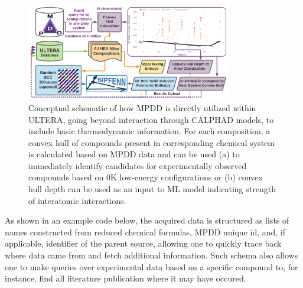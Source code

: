 \begin{figure}[H]
    \centering
    \includegraphics[width=0.8\textwidth]{ultera/ULTERA_BasicThermodynamics_V1.png}
    \caption{Conceptual schematic of how MPDD is directly utilized within ULTERA, going beyond interaction through CALPHAD models, to include basic thermodynamic information. For each composition, a convex hull of compounds present in corresponding chemical system is calculated based on MPDD data and can be used (a) to immediately identify candidates for experimentally observed compounds based on 0K low-energy configurations or (b) convex hull depth can be used as an input to ML model indicating strength of interatomic interactions.}
    \label{ultera:fig:mpdd}
\end{figure}

As shown in an example code below, the acquired data is structured as lists of names constructed from reduced chemical formulas, MPDD unique id, and, if applicable, identifier of the parent source, allowing one to quickly trace back where data came from and fetch additional information. Such schema also allows one to make queries over experimental data based on a specific compound to, for instance, find all literature publication where it may have occured.


